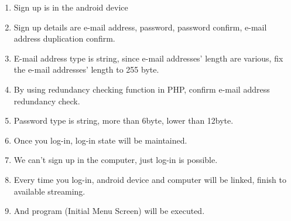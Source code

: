 \documentclass[12pt]{article}
\begin{document}
\begin{enumerate}
\item Sign up is in the android device
\item Sign up details are e-mail address, password, password confirm, e-mail address duplication confirm.
\item E-mail address type is string, since e-mail addresses’ length are various, fix the e-mail addresses’ length to 255 byte.
\item By using redundancy checking function in PHP, confirm e-mail address redundancy check.
\item Password type is string, more than 6byte, lower than 12byte.
\item Once you log-in, log-in state will be maintained.
\item We can’t sign up in the computer, just log-in is possible.
\item Every time you log-in, android device and computer will be linked, finish to available streaming.
\item And program (Initial Menu Screen) will be executed.
\end{enumerate}

\end{document}
